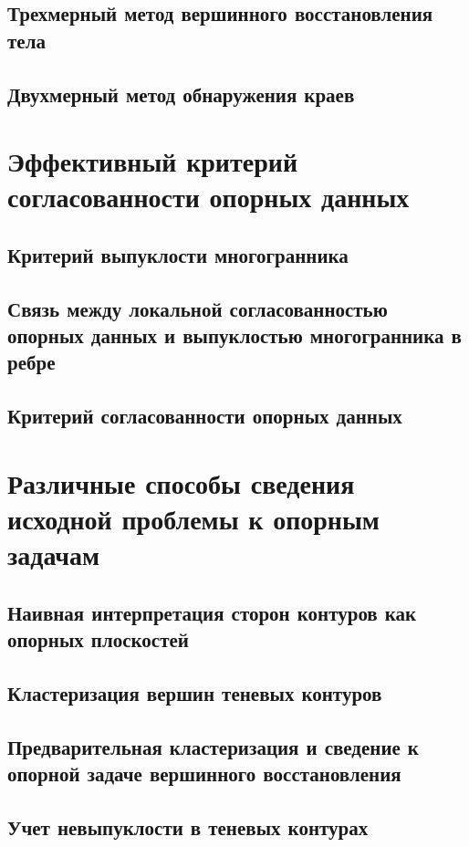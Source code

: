 \documentclass[a4paper, 12pt, titlepage]{article}
\theoremstyle{definition}
\theoremstyle{plain}
\theoremstyle{plain}
\begin{document}
\subsection{Трехмерный метод вершинного восстановления тела}

\subsection{Двухмерный метод обнаружения краев}


\section{Эффективный критерий согласованности опорных данных}

\subsection{Критерий выпуклости многогранника}

\subsection{Связь между локальной согласованностью опорных данных и выпуклостью
многогранника в ребре}

\subsection{Критерий согласованности опорных данных}


\section{Различные способы сведения исходной проблемы к опорным задачам}

\subsection{Наивная интерпретация сторон контуров как опорных плоскостей}

\subsection{Кластеризация вершин теневых контуров}

\subsection{Предварительная кластеризация и сведение к опорной задаче
вершинного восстановления}

\subsection{Учет невыпуклости в теневых контурах}



\newpage


\end{document}
